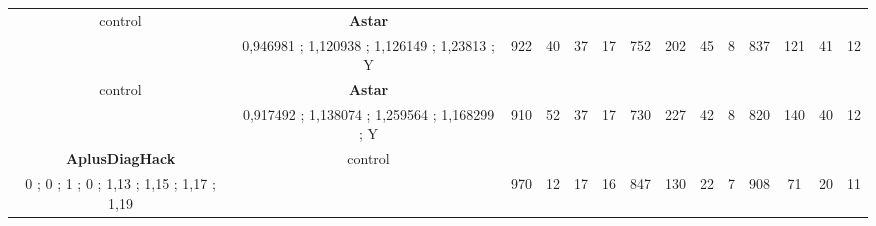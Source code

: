 \begin{table}[]
{\begin{tabular}{|c|c|c|c|c|c|c|c|c|c|c|c|c|c|}
control & \cellcolor{blue!15}\textbf{Astar}& {\color[HTML]{00009B} } & {\color[HTML]{9A0000} } & {\color[HTML]{009901} } &  & {\color[HTML]{00009B} } & {\color[HTML]{9A0000} } & {\color[HTML]{009901} } &  & {\color[HTML]{00009B} } & {\color[HTML]{9A0000} } & {\color[HTML]{009901} } &  \\ 
 & \cellcolor{ blue!15}0,946981 ; 1,120938 ; 1,126149 ; 1,23813 ; Y & \multirow{-2}{*}{{\color[HTML]{00009B} 922}} & \multirow{-2}{*}{{\color[HTML]{9A0000} 40}} & \multirow{-2}{*}{{\color[HTML]{009901} 37}} & \multirow{-2}{*}{17} & \multirow{-2}{*}{{\color[HTML]{00009B} 752}} & \multirow{-2}{*}{{\color[HTML]{9A0000} 202}} & \multirow{-2}{*}{{\color[HTML]{009901} 45}} & \multirow{-2}{*}{8} & \multirow{-2}{*}{{\color[HTML]{00009B} 837}} & \multirow{-2}{*}{{\color[HTML]{9A0000} 121}} & \multirow{-2}{*}{{\color[HTML]{009901} 41}} & \multirow{-2}{*}{12} \\ \hline

control & \cellcolor{blue!15}\textbf{Astar}& {\color[HTML]{00009B} } & {\color[HTML]{9A0000} } & {\color[HTML]{009901} } &  & {\color[HTML]{00009B} } & {\color[HTML]{9A0000} } & {\color[HTML]{009901} } &  & {\color[HTML]{00009B} } & {\color[HTML]{9A0000} } & {\color[HTML]{009901} } &  \\ 
 & \cellcolor{ blue!15}0,917492 ; 1,138074 ; 1,259564 ; 1,168299 ; Y & \multirow{-2}{*}{{\color[HTML]{00009B} 910}} & \multirow{-2}{*}{{\color[HTML]{9A0000} 52}} & \multirow{-2}{*}{{\color[HTML]{009901} 37}} & \multirow{-2}{*}{17} & \multirow{-2}{*}{{\color[HTML]{00009B} 730}} & \multirow{-2}{*}{{\color[HTML]{9A0000} 227}} & \multirow{-2}{*}{{\color[HTML]{009901} 42}} & \multirow{-2}{*}{8} & \multirow{-2}{*}{{\color[HTML]{00009B} 820}} & \multirow{-2}{*}{{\color[HTML]{9A0000} 140}} & \multirow{-2}{*}{{\color[HTML]{009901} 40}} & \multirow{-2}{*}{12} \\ \hline


\cellcolor{blue!15}\textbf{AplusDiagHack} & control& {\color[HTML]{00009B} } & {\color[HTML]{9A0000} } & {\color[HTML]{009901} } &  & {\color[HTML]{00009B} } & {\color[HTML]{9A0000} } & {\color[HTML]{009901} } &  & {\color[HTML]{00009B} } & {\color[HTML]{9A0000} } & {\color[HTML]{009901} } &  \\ 
\cellcolor{ blue!15}0 ; 0 ; 1 ; 0 ; 1,13 ; 1,15 ; 1,17 ; 1,19 &  & \multirow{-2}{*}{{\color[HTML]{00009B} 970}} & \multirow{-2}{*}{{\color[HTML]{9A0000} 12}} & \multirow{-2}{*}{{\color[HTML]{009901} 17}} & \multirow{-2}{*}{16} & \multirow{-2}{*}{{\color[HTML]{00009B} 847}} & \multirow{-2}{*}{{\color[HTML]{9A0000} 130}} & \multirow{-2}{*}{{\color[HTML]{009901} 22}} & \multirow{-2}{*}{7} & \multirow{-2}{*}{{\color[HTML]{00009B} 908}} & \multirow{-2}{*}{{\color[HTML]{9A0000} 71}} & \multirow{-2}{*}{{\color[HTML]{009901} 20}} & \multirow{-2}{*}{11} \\ \hline


\end{tabular}}
\end{table}
